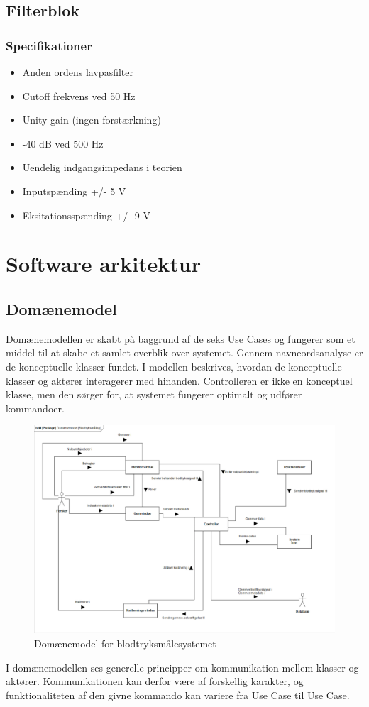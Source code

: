  \subsection{Filterblok}
 \subsubsection{Specifikationer}
 \begin{itemize}
 	\item Anden ordens lavpasfilter
 	\item Cutoff frekvens ved 50 Hz
 	\item Unity gain (ingen forstærkning)
 	\item -40 dB ved 500 Hz
 	\item Uendelig indgangsimpedans i teorien
 	\item Inputspænding +/- 5 V
 	\item Eksitationsspænding +/- 9 V
 \end{itemize}
 

\section{Software arkitektur}

\subsection{Domænemodel}
Domænemodellen er skabt på baggrund af de seks Use Cases og fungerer som et middel til at skabe et samlet overblik over systemet. Gennem navneordsanalyse er de konceptuelle klasser fundet. I modellen beskrives, hvordan de konceptuelle klasser og aktører interagerer med hinanden. Controlleren er ikke en konceptuel klasse, men den sørger for, at systemet fungerer optimalt og udfører kommandoer.

\begin{figure}[H]
	\centering
	\includegraphics[width=1 \textwidth]{Figurer/screenshot}
	\caption{Domænemodel for blodtryksmålesystemet}
\end{figure}
I domænemodellen ses generelle principper om kommunikation mellem klasser og aktører. Kommunikationen kan derfor være af forskellig karakter, og funktionaliteten af den givne kommando kan variere fra Use Case til Use Case.


